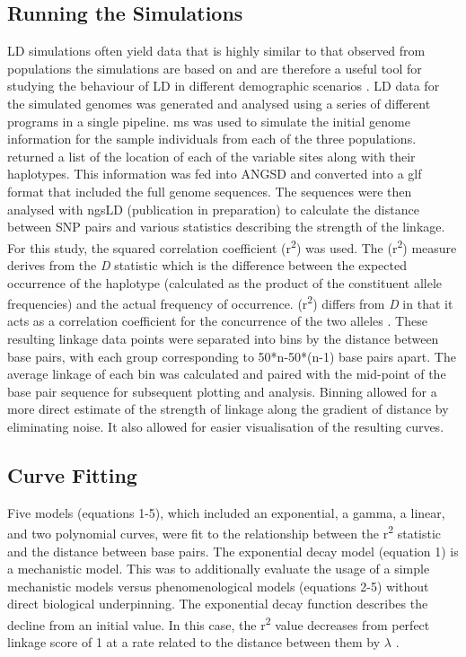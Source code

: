 \documentclass[11pt]{article}
\begin{document}
\begin{linenumbers}
\subsection{Running the Simulations}
LD simulations often yield data that is highly similar to that observed from populations the simulations are based on and are therefore a useful tool for studying the behaviour of LD in different demographic scenarios \citep{mcrae2005modeling}. LD data for the simulated genomes was generated and analysed using a series of different programs in a single pipeline. ms \citep{hudson2002generating} was used to simulate the initial genome information for the sample individuals from each of the three populations. \citep{hudson2002generating} returned a list of the location of each of the variable sites along with their haplotypes. This information was fed into ANGSD \citep{korneliussen_angsd:_2014} and converted into a glf format that included the full genome sequences. The sequences were then analysed with ngsLD (publication in preparation) to calculate the distance between SNP pairs and various statistics describing the strength of the linkage. For this study, the squared correlation coefficient (r\textsuperscript2) was used. The (r\textsuperscript2) measure derives from the \emph{D} statistic which is the difference between the expected occurrence of the haplotype (calculated as the product of the constituent allele frequencies) and the actual frequency of occurrence. (r\textsuperscript2) differs from \emph{D} in that it acts as a correlation coefficient for the concurrence of the two alleles \citep{slatkin2008linkage}. These resulting linkage data points were separated into bins by the distance between base pairs, with each group corresponding to 50*n-50*(n-1) base pairs apart. The average linkage of each bin was calculated and paired with the mid-point of the base pair sequence for subsequent plotting and analysis. Binning allowed for a more direct estimate of the strength of linkage along the gradient of distance by eliminating noise. It also allowed for easier visualisation of the resulting curves. 

\subsection{Curve Fitting}
Five models (equations 1-5), which included an exponential, a gamma, a linear, and two polynomial curves, were fit to the relationship between the r\textsuperscript2 statistic and the distance between base pairs. The exponential decay model (equation 1) is a mechanistic model. This was to additionally evaluate the usage of a simple mechanistic models versus phenomenological models (equations 2-5) without direct biological underpinning. The exponential decay function describes the decline from an initial value. In this case, the r\textsuperscript2 value decreases from perfect linkage score of 1 at a rate related to the distance between them by $\lambda$ . 


\end{linenumbers}
\end{document}

